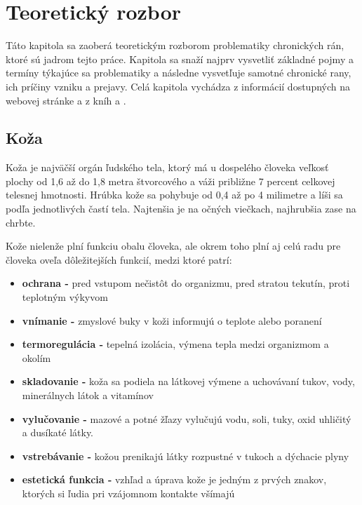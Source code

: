 \chapter{Teoretický rozbor}
Táto kapitola sa zaoberá teoretickým rozborom problematiky chronických rán, ktoré sú jadrom tejto práce. Kapitola sa snaží najprv vysvetliť základné pojmy a termíny týkajúce sa problematiky a následne vysvetľuje samotné chronické rany, ich príčiny vzniku a prejavy. Celá kapitola vychádza z informácií dostupných na webovej stránke \cite{pcCdSrbbhhlr5YcQ} a z kníh \cite{Hlinkova2015} a \cite{Pokorna2012}.  

\section{Koža}
Koža je najväčší orgán ľudského tela, ktorý má u dospelého človeka veľkosť plochy od 1,6 až do 1,8 metra štvorcového a váži približne 7 percent celkovej telesnej hmotnosti. Hrúbka kože sa pohybuje od 0,4 až po 4 milimetre a líši sa podľa jednotlivých častí tela. Najtenšia je na očných viečkach, najhrubšia zase na chrbte.

Kože nielenže plní funkciu obalu človeka, ale okrem toho plní aj celú radu pre človeka oveľa dôležitejších funkcií, medzi ktoré patrí:
\begin{itemize}  
\item \textbf{ochrana -} pred vstupom nečistôt do organizmu, pred stratou tekutín, proti teplotným výkyvom
\item \textbf{vnímanie -} zmyslové buky v koži informujú o teplote alebo poranení
\item \textbf{termoregulácia -} tepelná izolácia, výmena tepla medzi organizmom a okolím
\item \textbf{skladovanie -} koža sa podiela na látkovej výmene a uchovávaní tukov, vody, minerálnych látok a vitamínov
\item \textbf{vylučovanie -} mazové a potné žľazy vylučujú vodu, soli, tuky, oxid uhličitý a dusíkaté látky.
\item \textbf{vstrebávanie -} kožou prenikajú látky rozpustné v tukoch a dýchacie plyny
\item \textbf{estetická funkcia -} vzhľad a úprava kože je jedným z prvých znakov, ktorých si ľudia pri vzájomnom kontakte všímajú
\end{itemize}

